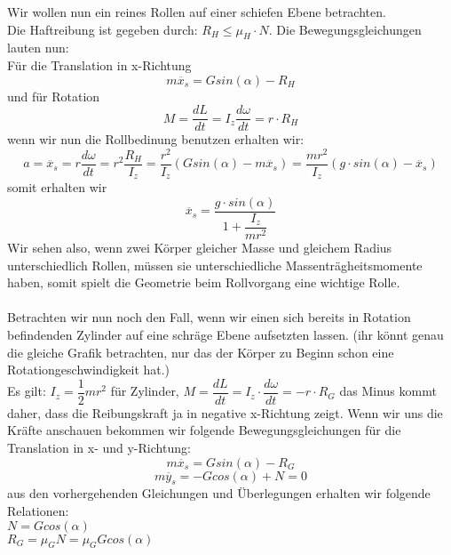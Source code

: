 \documentclass[12pt]{article}
\begin{document}
Wir wollen nun ein reines Rollen auf einer schiefen Ebene betrachten.\\
Die Haftreibung ist gegeben durch: $R_H \leq \mu_H \cdot N$. Die Bewegungsgleichungen lauten nun:\\
Für die Translation in x-Richtung
\begin{equation}
m \ddot{x_s} = Gsin(\alpha) - R_H
\end{equation}
und für Rotation
\begin{equation}
M = \dfrac{dL}{dt} = I_z \dfrac{d \omega}{dt} = r \cdot R_H
\end{equation}
wenn wir nun die Rollbedinung benutzen erhalten wir:
\begin{equation}
a = \ddot{x_s} = r \dfrac{d \omega}{dt} = r^2 \dfrac{R_H}{I_z} = \dfrac{r^2}{I_z} (G sin(\alpha) - m \ddot{x_s}) = \dfrac{m r^2}{I_z} (g \cdot sin(\alpha) - \ddot{x_s})
\end{equation}
somit erhalten wir \begin{equation}
\ddot{x_s} = \dfrac{g \cdot sin(\alpha)}{1 + \dfrac{I_z}{mr^2}}
\end{equation}
Wir sehen also, wenn zwei Körper gleicher Masse und gleichem Radius unterschiedlich Rollen, müssen sie unterschiedliche Massenträgheitsmomente haben, somit spielt die Geometrie beim Rollvorgang eine wichtige Rolle.
\\
\\
Betrachten wir nun noch den Fall, wenn wir einen sich bereits in Rotation befindenden Zylinder auf eine schräge Ebene aufsetzten lassen. (ihr könnt genau die gleiche Grafik betrachten, nur das der Körper zu Beginn schon eine Rotationgeschwindigkeit hat.)\\
Es gilt: $I_z = \dfrac{1}{2} mr^2$ für Zylinder, $M = \dfrac{dL}{dt} = I_z \cdot \dfrac{d \omega}{dt} = -r \cdot R_G$ das Minus kommt daher, dass die Reibungskraft ja in negative x-Richtung zeigt. Wenn wir uns die Kräfte anschauen bekommen wir folgende Bewegungsgleichungen für die Translation in x- und y-Richtung:
\begin{equation}
m \ddot{x_s} = Gsin(\alpha) -R_G
\end{equation}
\begin{equation}
m \ddot{y_s} = -Gcos(\alpha) + N = 0
\end{equation}
\clearpage
aus den vorhergehenden Gleichungen und Überlegungen erhalten wir folgende Relationen:\\
$N = Gcos(\alpha)$\\
$R_G = \mu_G N = \mu_G G cos(\alpha)$\\
\end{document}
